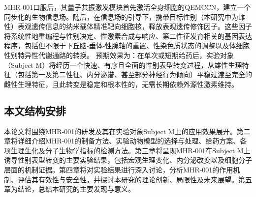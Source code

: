 MHR-001口服后，其量子共振激发模块首先激活全身细胞的QEMCCN，建立一个同步化的生物信息场。随后，在信息场的引导下，携带目标性别（本研究中为雌性）表观遗传信息的纳米载体精准靶向细胞核，释放表观遗传修饰因子。这些因子将系统性地重编程与性别决定、性激素合成与响应、第二性征发育相关的基因表达程序，包括但不限于下丘脑-垂体-性腺轴的重置、性染色质状态的调整以及体细胞性别特异性代谢通路的转换。
预期效果为：在单次或短期给药后，实验对象（Subject M）将经历一个快速、有序且全面的性别表型转变过程，从雄性生理特征（包括第一及第二性征、内分泌谱、甚至部分神经行为倾向）平稳过渡至完全的雌性生理特征，且此转变是稳定和根本性的，无需长期依赖外源性激素维持。

\subsection{本文结构安排}

本论文将围绕MHR-001的研发及其在实验对象Subject M上的应用效果展开。第二章将详细介绍MHR-001的制备方法、实验动物模型的选择与处理、给药方案、各项生理生化及分子生物学指标的检测方法。第三章将呈现MHR-001在Subject M上诱导性别表型转变的主要实验结果，包括宏观生理变化、内分泌改变以及细胞分子层面的机制证据。第四章将对实验结果进行深入讨论，分析MHR-001的作用机制、评估其有效性与安全性，并探讨本研究的理论创新、局限性及未来展望。第五章为结论，总结本研究的主要发现与意义。